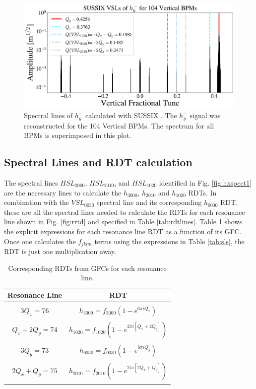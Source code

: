 \begin{figure}[H]
    \centering
    \includegraphics[width=\columnwidth]{chapter4/hyspect.png}
    \caption{Spectral lines of $h_y^{-}$ calculated with SUSSIX \cite{sussix}. The $h_y^{-}$ signal was reconstructed for the 104 Vertical BPMs. The spectrum for all BPMs is superimposed in this plot.}
    \label{fig:hyspect1}
\end{figure}

\subsection{Spectral Lines and RDT calculation}

The spectral lines $HSL_{3000}$, $HSL_{2010}$, and $HSL_{1020}$ identified in Fig. \ref{fig:hxspect1} are the necessary lines to calculate the $h_{3000}$, $h_{2010}$ and $h_{1020}$ RDTs. In combination with the $VSL_{0030}$ spectral line and its corresponding $h_{0030}$ RDT, these are all the spectral lines needed to calculate the RDTs for each resonance line shown in Fig. \ref{fig:rrtd} and specified in Table \ref{tab:rdtlines}. Table \ref{tab:rdts2} shows the explicit expressions for each resonance line RDT as a function of its GFC. Once one calculates the $f_{jklm}$ terms using the expressions in Table \ref{tab:sls}, the RDT is just one multiplication away.

\begin{table}[H]
    \centering
    \caption{Corresponding RDTs from GFCs for each resonance line.}
    \label{tab:rdts2}
    \begin{tabular}{cc}
    \toprule
    \textbf{Resonance Line} & \textbf{RDT} \\ \hline
     &  \\
    $3Q_x=76$ & $h_{3000}= f_{3000}\left( 1-e^{6\pi i  Q_x  } \right)$ \\
     &  \\
    $Q_x+2Q_y=74$ & $h_{1020}=f_{1020} \left( 1-e^{2\pi i \left[Q_x + 2 Q_y \right] }\right) $ \\
     &  \\
    $3Q_y=73$ & $h_{0030}= f_{0030}\left( 1-e^{6\pi i  Q_y  } \right)$ \\
     &  \\
    $2Q_x+Q_y=75$ & $h_{2010}=f_{2010} \left( 1-e^{2\pi i \left[2Q_x + Q_y \right] }\right) $ \\
     &  \\ \hline
    \end{tabular}
\end{table}

